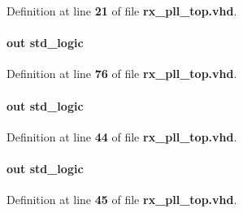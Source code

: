 Definition at line {\bf 21} of file {\bf rx\+\_\+pll\+\_\+top.\+vhd}.

\paragraph[{busy}]{ {\bfseries \textcolor{keywordflow}{out}\textcolor{vhdlchar}{ }} {\bfseries \textcolor{comment}{std\+\_\+logic}\textcolor{vhdlchar}{ }} \hspace{0.3cm}{\ttfamily [Port]}}\label{classrx__pll__top_aae338b3a18acd4650d65866291f3aece}


Definition at line {\bf 76} of file {\bf rx\+\_\+pll\+\_\+top.\+vhd}.

\paragraph[{c0}]{ {\bfseries \textcolor{keywordflow}{out}\textcolor{vhdlchar}{ }} {\bfseries \textcolor{comment}{std\+\_\+logic}\textcolor{vhdlchar}{ }} \hspace{0.3cm}{\ttfamily [Port]}}\label{classrx__pll__top_a51a13db7a16824f73cd8e8b973b0cced}


Definition at line {\bf 44} of file {\bf rx\+\_\+pll\+\_\+top.\+vhd}.

\paragraph[{c1}]{ {\bfseries \textcolor{keywordflow}{out}\textcolor{vhdlchar}{ }} {\bfseries \textcolor{comment}{std\+\_\+logic}\textcolor{vhdlchar}{ }} \hspace{0.3cm}{\ttfamily [Port]}}\label{classrx__pll__top_a38653a6801eda9618dd3797b467967ca}


Definition at line {\bf 45} of file {\bf rx\+\_\+pll\+\_\+top.\+vhd}.

